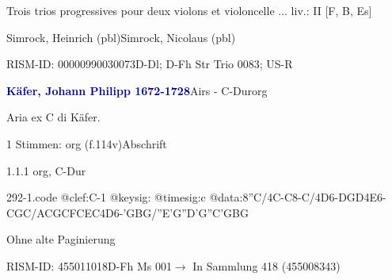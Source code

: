 \documentclass[twocolumn]{book}
\begin{document}
\par \begin{itshape}Trois trios progressives pour deux violons et violoncelle ... liv.: II [F, B, Es]\end{itshape} \newline Simrock, Heinrich  (pbl)\newline Simrock, Nicolaus  (pbl)
\par RISM-ID: 00000990030073\newline D-Dl; D-Fh  Str Trio 0083; US-R
\par \vspace{7pt} \textcolor{darkblue}{\textbf{Käfer, Johann Philipp  1672-1728}}\hfillplus{\textbf{[292]}}\newline Airs - C-Dur\newline org
\par \begin{itshape}[f.114v, heading:] Aria ex C di Käfer.\end{itshape} 
\par \textcolor{darkblue}{}  1 Stimmen: org  (f.114v)\newline Abschrift
\par 1.1.1  org, C-Dur  
\begin{filecontents*}{292-1.code}
@clef:C-1
@keysig:
@timesig:c
@data:8''C/4C-C8-C/4D6-{DGD}4E6-{CGC}/{ACGC}{FCEC}4D6-{'GBG}/{''E'G''D'G}{''C'GBG}
\end{filecontents*}
\newline
%
\par Ohne alte Paginierung
\par RISM-ID: 455011018\newline D-Fh  Ms 001\newline $\rightarrow$ In Sammlung 418 (455008343)
      
\end{document}
